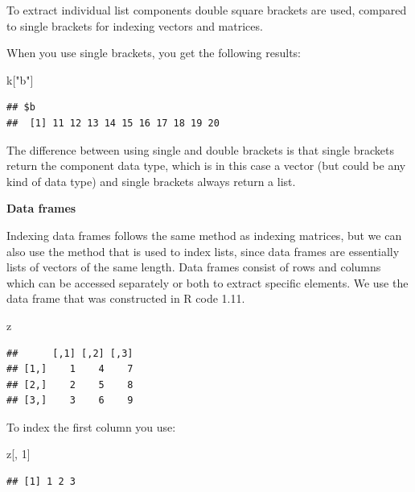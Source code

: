 \documentclass[
]{book}
\newenvironment{Shaded}{\begin{snugshade}}{\end{snugshade}}
\newcommand{\DecValTok}[1]{\textcolor[rgb]{0.00,0.00,0.81}{#1}}
\newcommand{\NormalTok}[1]{#1}
\newcommand{\StringTok}[1]{\textcolor[rgb]{0.31,0.60,0.02}{#1}}
\begin{document}
To extract individual list components double square brackets are used, compared to single brackets for indexing vectors and matrices.

When you use single brackets, you get the following results:

\begin{Shaded}
\begin{Highlighting}[]
\NormalTok{k[}\StringTok{"b"}\NormalTok{]}
\end{Highlighting}
\end{Shaded}

\begin{verbatim}
## $b
##  [1] 11 12 13 14 15 16 17 18 19 20
\end{verbatim}

The difference between using single and double brackets is that single brackets return the component data type, which is in this case a vector (but could be any kind of data type) and single brackets always return a list.

\textbf{Data frames}

Indexing data frames follows the same method as indexing matrices, but we can also use the method that is used to index lists, since data frames are essentially lists of vectors of the same length. Data frames consist of rows and columns which can be accessed separately or both to extract specific elements. We use the data frame that was constructed in R code 1.11.

\begin{Shaded}
\begin{Highlighting}[]
\NormalTok{z}
\end{Highlighting}
\end{Shaded}

\begin{verbatim}
##      [,1] [,2] [,3]
## [1,]    1    4    7
## [2,]    2    5    8
## [3,]    3    6    9
\end{verbatim}

To index the first column you use:

\begin{Shaded}
\begin{Highlighting}[]
\NormalTok{z[, }\DecValTok{1}\NormalTok{]}
\end{Highlighting}
\end{Shaded}

\begin{verbatim}
## [1] 1 2 3
\end{verbatim}
\end{document}
